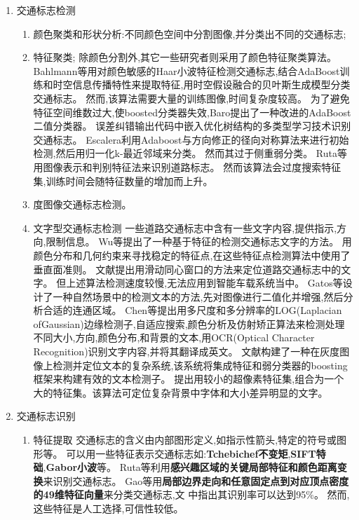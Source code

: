 \documentclass{amsart}
\begin{document}
\begin{enumerate}
\item 交通标志检测
  \begin{enumerate}
  \item 颜色聚类和形状分析:不同颜色空间中分割图像,并分类出不同的交通标志;
  \item 特征聚类;
    除颜色分割外,其它一些研究者则采用了颜色特征聚类算法。
    Bahlmann等用对颜色敏感的Haar小波特征检测交通标志,结合AdaBoost训练和时空信息传播特性来提取特征,用时空假设融合的贝叶斯生成模型分类交通标志。
    然而,该算法需要大量的训练图像,时间复杂度较高。
    为了避免特征空间维数过大,使boosted分类器失效,Baro提出了一种改进的AdaBoost二值分类器。
    误差纠错输出代码中嵌入优化树结构的多类型学习技术识别交通标志。
    Escalera利用Adaboost与方向修正的径向对称算法来进行初始检测,然后用归一化k-最近邻域来分类。
    然而其过于侧重弱分类。
    Ruta等用图像表示和判别特征法来识别道路标志。
    然而该算法会过度搜索特征集,训练时间会随特征数量的增加而上升。
  \item 度图像交通标志检测。
  \item 文字型交通标志检测
    一些道路交通标志中含有一些文字内容,提供指示,方向,限制信息。
    Wu等提出了一种基于特征的检测交通标志文字的方法。
    用颜色分布和几何约束来寻找稳定的特征点,在这些特征点检测算法中使用了垂直面准则。
    文献提出用滑动同心窗口的方法来定位道路交通标志中的文字。
    但上述算法检测速度较慢,无法应用到智能车载系统当中。
    Gatos等设计了一种自然场景中的检测文本的方法,先对图像进行二值化并增强,然后分析合适的连通区域。
    Chen等提出用多尺度和多分辨率的LOG(Laplacian ofGaussian)边缘检测子,自适应搜索,颜色分析及仿射矫正算法来检测处理不同大小,方向,颜色分布,和背景的文本,用OCR(Optical Character Recognition)识别文字内容,并将其翻译成英文。
    文献构建了一种在灰度图像上检测并定位文本的复杂系统,该系统将集成特征和弱分类器的boosting框架来构建有效的文本检测子。
    提出用较小的超像素特征集,组合为一个大的特征集。该算法可定位复杂背景中字体和大小差异明显的文字。
  \end{enumerate}
\item 交通标志识别
  \begin{enumerate}
  \item 特征提取
    交通标志的含义由内部图形定义,如指示性箭头,特定的符号或图形等。
    可以用一些特征表示交通标志如:\textbf{Tchebichef不变矩},\textbf{SIFT特础},\textbf{Gabor小波}等。
    Ruta等利用\textbf{感兴趣区域的关键局部特征和颜色距离变换}来识别交通标志。
    Gao等用\textbf{局部边界走向和任意固定点到对应顶点密度的49维特征向量}来分类交通标志,文
    中指出其识别率可以达到95\%。
    然而,这些特征是人工选择,可信性较低。

\end{enumerate}
\end{enumerate}
\end{document}
